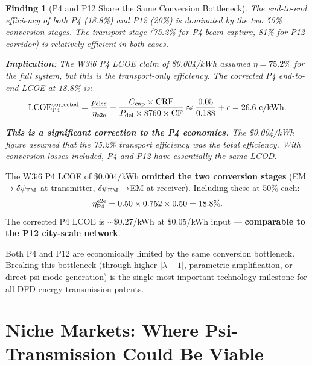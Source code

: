 \documentclass[11pt]{article}
\newtheorem{finding}{Finding}
\newcommand{\dpsiEM}{\delta\psi_{\rm EM}}
\newcommand{\lambdaone}{|\lambda{-}1|}
\begin{document}
\begin{finding}[P4 and P12 Share the Same Conversion Bottleneck]
\label{find:shared-bottleneck}
The end-to-end efficiency of both P4 (18.8\%) and P12 (20\%) is
dominated by the two 50\% conversion stages. The transport stage
(75.2\% for P4 beam capture, 81\% for P12 corridor) is relatively
efficient in both cases.

\textbf{Implication}: The W3i6 P4 LCOE claim of \$0.004/kWh assumed
$\eta = 75.2\%$ for the full system, but this is the transport-only
efficiency. The corrected P4 end-to-end LCOE at 18.8\% is:
\begin{equation}
\text{LCOE}_{\rm P4}^{\rm corrected} = \frac{p_{\rm elec}}{\eta_{\rm e2e}}
+ \frac{C_{\rm cap}\times\text{CRF}}{P_{\rm del}\times 8760\times\text{CF}}
\approx \frac{0.05}{0.188} + \epsilon = 26.6~\text{c/kWh}.
\end{equation}

\textbf{This is a significant correction to the P4 economics.} The
\$0.004/kWh figure assumed that the 75.2\% transport efficiency was the
total efficiency. With conversion losses included, P4 and P12 have
essentially the same LCOD.
\end{finding}

\begin{tcolorbox}[colback=red!5!white, colframe=red!60!black,
  title=\textbf{CORRECTION: P4 LCOE Requires Conversion Losses}]
The W3i6 P4 LCOE of \$0.004/kWh \textbf{omitted the two conversion
stages} (EM$\to\dpsiEM$ at transmitter, $\dpsiEM\to$EM at receiver).
Including these at 50\% each:
\begin{equation}
\eta_{\rm P4}^{\rm e2e} = 0.50\times 0.752\times 0.50 = 18.8\%.
\end{equation}
The corrected P4 LCOE is $\sim$\$0.27/kWh at \$0.05/kWh input ---
\textbf{comparable to the P12 city-scale network}.

Both P4 and P12 are economically limited by the same conversion
bottleneck. Breaking this bottleneck (through higher $\lambdaone$,
parametric amplification, or direct psi-mode generation) is the
single most important technology milestone for all DFD energy
transmission patents.
\end{tcolorbox}

\section{Niche Markets: Where Psi-Transmission Could Be Viable}
\label{sec:P12-niche}
\end{document}
